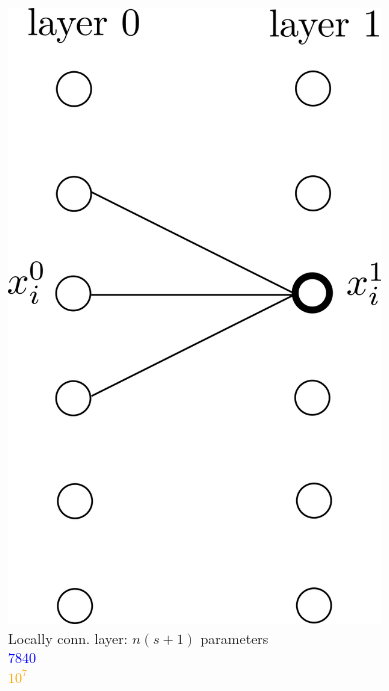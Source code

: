 \documentclass[xcolor=pdftex,dvipsnames,table,mathserif]{beamer}
\begin{document}
{\begin{columns}
    \begin{column}{0.3\textwidth}
      \begin{center}
        \includegraphics[width=0.74\textwidth]{locally_connected_layer.png}
        \\ \scriptsize{Locally conn. layer: $n(s+1)$ parameters}
        \\ \textcolor{blue}{\scriptsize{$7840$}}
        \\ \textcolor{orange}{\scriptsize{$10^7$}}
      \end{center}
    \end{column}


\end{columns}}
\end{document}
